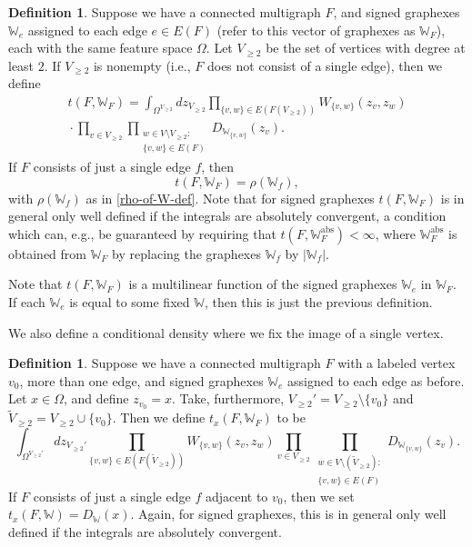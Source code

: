 \documentclass{amsart}
\numberwithin{equation}{section}
\numberwithin{figure}{section}
\theoremstyle{definition}
\newtheorem{definition}[theorem]{Definition}
\theoremstyle{remark}
\newcommand{\cW}{\mathbb{W}}
\begin{document}
\begin{definition}
Suppose we have a connected multigraph $F$, and signed graphexes $\cW_e$
assigned to each edge $e \in E(F)$ (refer to this vector of graphexes as
$\cW_F$), each with the same feature space $\Omega$. Let $V_{\ge 2}$ be the
set of vertices with degree at least $2$. If $V_{\ge 2}$ is nonempty (i.e.,
$F$ does not consist of a single edge), then we define
\begin{multline*}
t(F,\cW_F) = \int_{\Omega^{V_{\ge 2}}}dz_{V_{\ge 2}} \prod_{\{v,w\} \in E(F(V_{\ge 2}))}
W_{\{v,w\}}(z_v,z_w)\\
\phantom{} \cdot \prod_{v \in V_{\ge 2}} \prod_{\substack{w \in V \setminus V_{\geq 2}:\\\{v,w\} \in E(F)}} D_{\cW_{\{v,w\}}}(z_v).
\qquad\end{multline*}
If $F$ consists of just a single edge $f$, then
\[t(F,\cW_F)=
\rho(\cW_f),
\]
with $\rho(\cW_f)$ as in \eqref{rho-of-W-def}. Note that for signed graphexes
$t(F,\cW_F)$ is in general only well defined if the integrals are absolutely
convergent, a condition which can, e.g., be guaranteed by requiring that
$t(F,\cW_F^{\text{abs}})<\infty$, where $\cW_F^{\text{abs}}$ is obtained from
$\cW_F$ by replacing the graphexes $\cW_f$ by $|\cW_f|$.
\end{definition}

Note that $t(F,\cW_F)$ is a multilinear function of the signed graphexes
$\cW_e$ in $\cW_F$. If each $\cW_e$ is equal to some fixed $\cW$, then this
is just the previous definition.

We also define a conditional density where we fix the image of a single
vertex.

\begin{definition}
Suppose we have a connected multigraph $F$ with a labeled vertex $v_0$, more
than one edge, and signed graphexes $\cW_e$ assigned to each edge as before.
Let $x \in \Omega$, and define $z_{v_0}=x$. Take, furthermore, $V_{\geq
2}'=V_{\geq 2} \setminus \{v_0\}$ and $\widetilde{V}_{\geq 2}=V_{\geq 2} \cup
\{v_0\}$. Then we define $t_x(F,\cW_F)$ to be
\[
\int_{\Omega^{V_{\geq 2}'}} dz_{V_{\geq 2}'} \prod_{\{v,w\} \in
E(F(\widetilde V_{\geq2}))} W_{\{v,w\}}(z_v,z_w)
\prod_{v \in
{V_{\ge 2}}}
\prod_{\substack{w \in V \setminus (\widetilde V_{\geq 2}):\\ \{v,w\} \in E(F)}} D_{\cW_{\{v,w\}}}(z_v) .
\]
If $F$ consists of just a single edge $f$ adjacent to $v_0$, then we set
$t_x(F,\cW)=D_{\cW}(x)$. Again, for signed graphexes, this is in general only
well defined if the integrals are absolutely convergent.
\end{definition}
\end{document}
